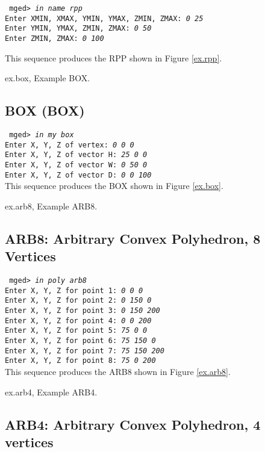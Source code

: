 {\tt
mged> {\em in name rpp}\\
Enter XMIN, XMAX, YMIN, YMAX, ZMIN, ZMAX: {\em 0 25} \\
Enter YMIN, YMAX, ZMIN, ZMAX: {\em 0 50} \\
Enter ZMIN, ZMAX: {\em 0 100} \\
}

This sequence produces the RPP shown in Figure \ref{ex.rpp}.

\mfig ex.box, Example BOX.
\subsection{BOX (BOX)}

{\tt
mged> {\em in my box} \\
Enter X, Y, Z of vertex: {\em 0 0 0} \\
Enter X, Y, Z of vector H: {\em 25 0 0} \\
Enter X, Y, Z of vector W: {\em 0 50 0} \\
Enter X, Y, Z of vector D: {\em 0 0 100} \\
}
This sequence produces the BOX shown in Figure \ref{ex.box}.

\mfig ex.arb8, Example ARB8.
\subsection{ARB8: Arbitrary Convex Polyhedron, 8 Vertices}

{\tt
mged> {\em in poly arb8} \\
Enter X, Y, Z for point 1: {\em 0 0 0} \\
Enter X, Y, Z for point 2: {\em 0 150 0} \\
Enter X, Y, Z for point 3: {\em 0 150 200} \\
Enter X, Y, Z for point 4: {\em 0 0 200} \\
Enter X, Y, Z for point 5: {\em 75 0 0} \\
Enter X, Y, Z for point 6: {\em 75 150 0} \\
Enter X, Y, Z for point 7: {\em 75 150 200} \\
Enter X, Y, Z for point 8: {\em 75 0 200} \\
}
This sequence produces the ARB8 shown in Figure \ref{ex.arb8}.

\mfig ex.arb4, Example ARB4.
\subsection{ARB4: Arbitrary Convex Polyhedron, 4 vertices}

